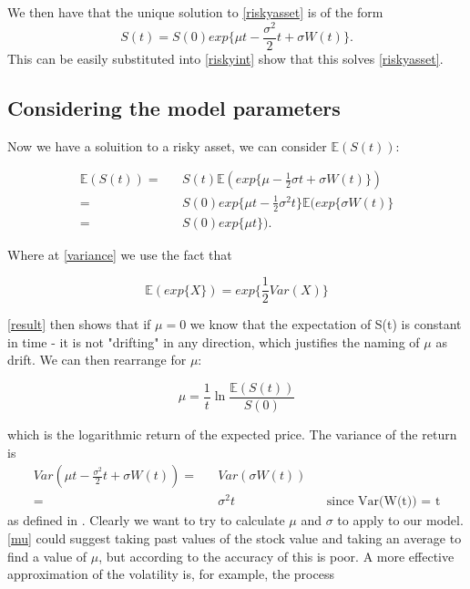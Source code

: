 \documentclass[11pt]{article} %
\begin{document}
We then have that the unique solution to \ref{riskyasset} is of the form 
\begin{equation}
    S(t) = S(0)exp\{\mu t - \frac{\sigma^2}{2}t + \sigma W(t)\}.
\end{equation}
This can be easily substituted into \ref{riskyint} show that this solves \ref{riskyasset}.

\subsection{Considering the model parameters}

Now we have a soluition to a risky asset, we can consider $\mathbb{E}(S(t))$:

\begin{align}
    \mathbb{E}(S(t))  = &&S(t)\mathbb{E}(exp\{\mu - \frac{1}{2}\sigma t + \sigma W(t)\})\\
     \label{variance}= 
     && S(0)exp\{\mu t - \frac{1}{2}\sigma^2 t\}\mathbb{E}(exp\{\sigma W(t)\} \\
    \label{result} = && S(0)exp\{\mu t\}).
\end{align}

Where at \ref{variance} we use the fact that 

\begin{equation*}
    \mathbb{E}(exp\{X\}) = exp\{\frac{1}{2}Var(X)\}
\end{equation*}

\ref{result} then shows that if $\mu = 0$ we know that the expectation of S(t) is 
constant in time - it is not "drifting" in any direction, which justifies the 
naming of $\mu$ as drift. We can then rearrange for $\mu$:

\begin{equation} \label{mu}
    \mu = \frac{1}{t}\ln{\frac{\mathbb{E}(S(t))}{S(0)}}
\end{equation}

which is the logarithmic return of the expected price.
The variance of the return is 
\begin{align}
    Var(\mu t - \frac{\sigma^2}{2}t + \sigma W(t)) = && Var(\sigma W(t)) \\
    = && \sigma^2t  && \text{since Var(W(t)) = t}
\end{align}
as defined in \cite{blackscholes}. Clearly we want to try to calculate $\mu$ and 
$\sigma$ to apply to our model. \ref{mu} could suggest taking past values of the 
stock value and taking an average to find a value of $\mu$, but according to 
\cite{blackscholes} the accuracy of this is poor. 
A more effective approximation of the volatility is, for example, the process 
\end{document}
